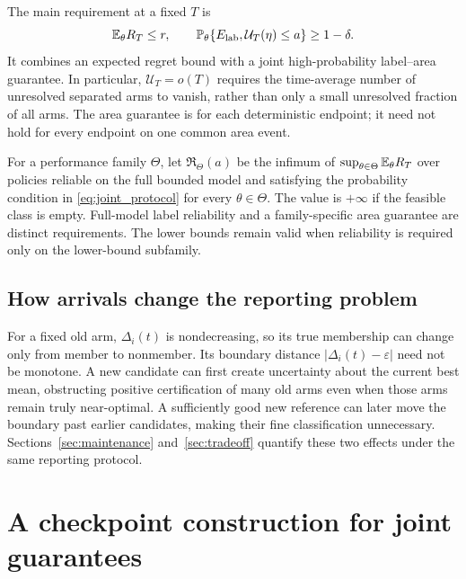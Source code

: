 \documentclass[11pt]{article}
\begin{document}
The main requirement at a fixed $T$ is
\begin{equation}
 \mathbb E_\theta R_T\le r,\qquad
 \mathbb P_\theta\{E_{\rm lab},\mathcal U_T(\eta)\le a\}\ge1-\delta.
 \label{eq:joint_protocol}
\end{equation}
It combines an expected regret bound with a joint high-probability
label--area guarantee. In particular, $\mathcal U_T=o(T)$ requires the
time-average number of unresolved separated arms to vanish, rather than
only a small unresolved fraction of all arms. The area guarantee is for
each deterministic endpoint; it need not hold for every endpoint on one
common area event.

For a performance family $\Theta$, let $\mathfrak R_\Theta(a)$ be the
infimum of $\sup_{\theta\in\Theta}\mathbb E_\theta R_T$ over policies reliable on
the full bounded model and satisfying the probability condition in
\eqref{eq:joint_protocol} for every $\theta\in\Theta$. The value is
$+\infty$ if the feasible class is empty. Full-model label reliability
and a family-specific area guarantee are distinct requirements. The
lower bounds remain valid when reliability is required only on the
lower-bound subfamily.

\subsection{How arrivals change the reporting problem}

For a fixed old arm, $\Delta_i(t)$ is nondecreasing, so its true membership
can change only from member to nonmember. Its boundary distance
$|\Delta_i(t)-\varepsilon|$ need not be monotone. A new candidate can first
create uncertainty about the current best mean, obstructing positive
certification of many old arms even when those arms remain truly
near-optimal. A sufficiently good new reference can later move the
boundary past earlier candidates, making their fine classification
unnecessary. Sections~\ref{sec:maintenance} and~\ref{sec:tradeoff} quantify
these two effects under the same reporting protocol.

\section{A checkpoint construction for joint guarantees}
\label{sec:method}
\end{document}
